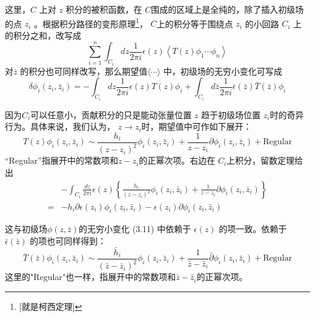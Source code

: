 这里，$ C$ 上对 $z$ 积分的被积函数，在 $C $围成的区域上是全纯的，除了插入初级场的点 $z_i$ 。根据积分路径的变形原理\footnote{[就是柯西定理]}， $C $上的积分等于围绕点 $z_i$ 的小回路 $C_i$ 上的积分之和，改写成
\[
\sum_{i=1}^{n} \int_{C_{i}} d z \frac{1}{2 \pi i} \epsilon(z)\left\langle T(z) \phi_{1} \cdots \phi_{n}\right\rangle
\]
对$ \bar{z}$ 的积分也可同样改写，那么期望值$ \langle \cdots \rangle$ 中，初级场的无穷小变化可写成
\begin{equation}
	\delta \phi_{i}\left(z_{i}, \bar{z}_{i}\right)=-\int_{C_{i}} d z \frac{1}{2 \pi i} \epsilon(z) T(z) \phi_{i}+\int_{C_{i}} d \bar{z} \frac{1}{2 \pi i} \bar{\epsilon}(\bar{z}) \bar{T}(\bar{z}) \phi_{i}
\end{equation}

因为$ C_i $可以任意小，贡献积分的只是能动张量位置 $z$ 趋于初级场位置 $z_i $时的奇异行为。具体来说，我们认为， $z\to z_i $时，期望值中可作如下展开：
\begin{equation}
T(z) \phi_{i}\left(z_{i}, \bar{z}_{i}\right)\sim\frac{h_{i}}{\left(z-z_{i}\right)^{2}} \phi_{i}\left(z_{i}, \bar{z}_{i}\right)+\frac{1}{z-z_{i}} \partial \phi_{i}\left(z_{i}, \bar{z}_{i}\right)+\text{Regular}
\end{equation}
“Regular”指展开中的常数项和$z-z_i $的正幂次项。右边在 $C_i $上积分，留数定理给出
\begin{equation}
\begin{aligned} &-\int_{C_{i}} \frac{d z}{2 \pi i} \epsilon(z)\left\{\frac{h_{i}}{\left(z-z_{i}\right)^{2}} \phi_{i}\left(z_{i}, \bar{z}_{i}\right)+\frac{1}{z-z_{i}} \partial \phi_{i}\left(z_{i}, \bar{z}_{i}\right)\right\} \\ =&-h_{i} \partial \epsilon\left(z_{i}\right) \phi_{i}\left(z_{i}, \bar{z}_{i}\right)-\epsilon\left(z_{i}\right) \partial \phi_{i}\left(z_{i}, \bar{z}_{i}\right) \end{aligned}
\end{equation}

这与初级场$ \phi(z,\bar{z}) $的无穷小变化 (3.11) 中依赖于 $\epsilon(z)$ 的项一致。依赖于 $\bar{\epsilon}(\bar{z})$ 的项也可同样得到：
\begin{equation}
\bar{T}(\bar{z}) \phi_{i}\left(z_{i}, \bar{z}_{i}\right) \sim \frac{\bar{h}_{i}}{\left(\bar{z}-\bar{z}_{i}\right)^{2}} \phi_{i}\left(z_{i}, \bar{z}_{i}\right)+\frac{1}{\bar{z}-\bar{z}_{i}} \bar{\partial} \phi_{i}\left(z_{i}, \bar{z}_{i}\right)+\text{Regular}
\end{equation}
这里的"Regular"也一样，指展开中的常数项和$ \bar{z}-\bar{z}_i $的正幂次项。

